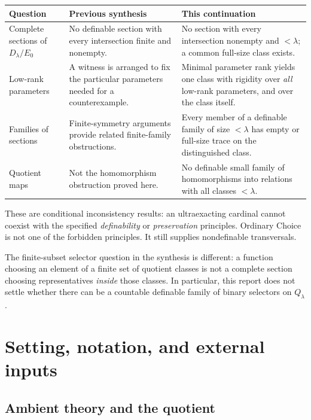\documentclass[11pt,letterpaper]{article}
\theoremstyle{definition}
\numberwithin{equation}{section}
\newcommand{\D}{D_\lambda}
\newcommand{\Q}{Q_\lambda}
\begin{document}
\begin{center}
\begin{tabularx}{\textwidth}{@{}P{.23\textwidth}YY@{}}
\toprule
\textbf{Question} & \textbf{Previous synthesis} & \textbf{This continuation}\\
\midrule
Complete sections of $\D/E_0$ & No definable section with every intersection finite and nonempty. & No section with every intersection nonempty and $<\lambda$; a common full-size class exists.\\[3pt]
Low-rank parameters & A witness is arranged to fix the particular parameters needed for a counterexample. & Minimal parameter rank yields one class with rigidity over \emph{all} low-rank parameters, and over the class itself.\\[3pt]
Families of sections & Finite-symmetry arguments provide related finite-family obstructions. & Every member of a definable family of size $<\lambda$ has empty or full-size trace on the distinguished class.\\[3pt]
Quotient maps & Not the homomorphism obstruction proved here. & No definable small family of homomorphisms into relations with all classes $<\lambda$.\\
\bottomrule
\end{tabularx}
\end{center}

These are conditional inconsistency results: an ultraexacting cardinal cannot coexist with the specified \emph{definability} or \emph{preservation} principles. Ordinary Choice is not one of the forbidden principles. It still supplies nondefinable transversals.

The finite-subset selector question in the synthesis is different: a function choosing an element of a finite set of quotient classes is not a complete section choosing representatives \emph{inside} those classes. In particular, this report does not settle whether there can be a countable definable family of binary selectors on $\Q$.

\newpage
\section{Setting, notation, and external inputs}\label{sec:setup}

\subsection{Ambient theory and the quotient}
\end{document}
